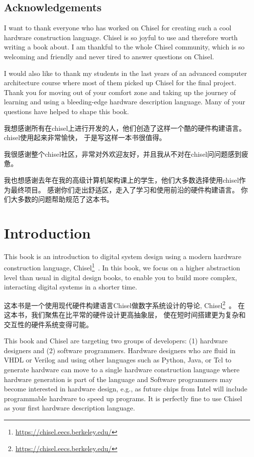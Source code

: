 \documentclass[%
    10pt,
    headinclude, footexclude,
    openright, %
    notitlepage,
    cleardoubleempty,
    headsepline,
    pointlessnumbers,
    bibtotoc, idxtotoc,
    ]{scrbook}
\newcommand{\myref}[2]{\href{#1}{#2}}
\renewcommand{\myref}[2]{{#2}{\footnote{\url{#1}}}}
\begin{document}
\section*{Acknowledgements}

I want to thank everyone who has worked on Chisel for creating such
a cool hardware construction language. Chisel is so joyful to use and
therefore worth writing a book about.
I am thankful to the whole Chisel community, which is so welcoming and friendly
and never tired to answer questions on Chisel.

I would also like to thank my students in the last years of an advanced computer
architecture course where most of them picked up Chisel for the final project.
Thank you for moving out of your comfort zone and taking up the journey of
learning and using a bleeding-edge hardware description language.
Many of your questions have helped to shape this book.

我想感谢所有在chisel上进行开发的人，他们创造了这样一个酷的硬件构建语言。chisel使用起来非常愉快，
于是写这样一本书很值得。

我很感谢整个chisel社区，非常对外欢迎友好，并且我从不对在chisel问问题感到疲惫。

我也想感谢去年在我的高级计算机架构课上的学生，他们大多数选择使用chisel作为最终项目。
感谢你们走出舒适区，走入了学习和使用前沿的硬件构建语言。
你们大多数的问题帮助规范了这本书。


\mainmatter

\chapter{Introduction}
\label{sec:intro}

This book is an introduction to digital system design using a modern hardware
construction language, \myref{https://chisel.eecs.berkeley.edu/}{Chisel}~\cite{chisel:dac2012}.
In this book, we focus on a higher abstraction level than usual in digital design books,
to enable you to build more complex, interacting digital systems in a shorter time.

这本书是一个使用现代硬件构建语言Chisel做数字系统设计的导论, 
\myref{https://chisel.eecs.berkeley.edu/}{Chisel}~\cite{chisel:dac2012}。
在这本书，我们聚焦在比平常的硬件设计更高抽象层，
使在短时间搭建更为复杂和交互性的硬件系统变得可能。

This book and Chisel are targeting two groups of developers:
(1) hardware designers and (2) software programmers.
Hardware designers who are fluid in VHDL or Verilog and using other languages such as Python,
Java, or Tcl to generate hardware can move to a single hardware construction language
where hardware generation is part of the language and
Software programmers may become interested in hardware design,
e.g., as future chips from Intel will include programmable hardware to speed up programs.
It is perfectly fine to use Chisel as your first hardware description language.
\end{document}
